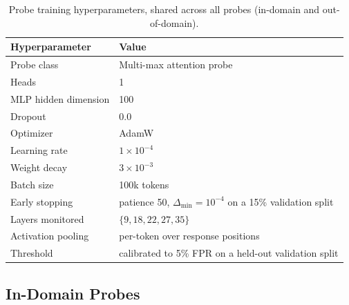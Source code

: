 \documentclass{article}
\begin{document}
\begin{table}[h]
\centering
\begin{tabular}{ll}
\toprule
\textbf{Hyperparameter} & \textbf{Value} \\
\midrule
Probe class & Multi-max attention probe \\
Heads & 1 \\
MLP hidden dimension & 100 \\
Dropout & 0.0 \\
\midrule
Optimizer & AdamW \\
Learning rate & $1 \times 10^{-4}$ \\
Weight decay & $3 \times 10^{-3}$ \\
Batch size & 100k tokens \\
Early stopping & patience 50, $\Delta_{\min}=10^{-4}$ on a 15\% validation split \\
\midrule
Layers monitored & $\{9, 18, 22, 27, 35\}$ \\
Activation pooling & per-token over response positions \\
Threshold & calibrated to 5\% FPR on a held-out validation split \\
\bottomrule
\end{tabular}
\vspace{0.5em}
\caption{Probe training hyperparameters, shared across all probes (in-domain and out-of-domain).}
\label{tab:probe_hyperparameters}
\end{table}

\subsection{In-Domain Probes}
\label{app:probetraining_indomain}
\end{document}

